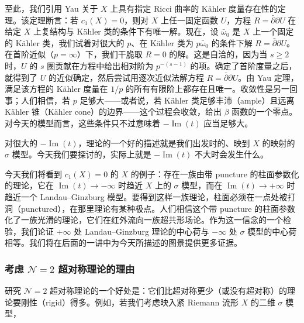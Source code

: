 至此，我们引用 Yau 关于 $X$ 上具有指定 Ricci 曲率的 Kähler 度量存在性的定理。该定理断言：若 $c_1(X)=0$，则对 $X$ 上任一固定函数 $U$，方程 $R=\bar\partial\partial U$ 在给定 $X$ 上复结构与 Kähler 类的条件下有唯一解。现在，设 $\bar\omega_0$ 是 $X$ 上一个固定的 Kähler 类，我们试着对很大的 $p$、在 Kähler 类为 $p\bar\omega_0$ 的条件下解 $R=\bar\partial\partial U$。在首阶近似（$p=\infty$）下，我们干脆取 $R=0$ 的解。这是自洽的，因为当 $s\ge2$ 时，$U$ 的 $s$ 圈贡献在方程中给出相对阶为 $p^{-(s-1)}$ 的项。确定了首阶度量之后，就得到了 $U$ 的近似确定，然后尝试用逐次近似法解方程 $R=\bar\partial\partial U$。由 Yau 定理，满足该方程的 Kähler 度量在 $1/p$ 的所有有限阶上都存在且唯一。收敛性是另一回事；人们相信，若 $p$ 足够大——或者说，若 Kähler 类足够丰沛（ample）且远离 Kähler 锥（Kähler cone）的边界——这个过程会收敛，给出 $\beta$ 函数的一个零点。对今天的模型而言，这些条件只不过意味着 $-\operatorname{Im}(t)$ 应当足够大。

对很大的 $-\operatorname{Im}(t)$，理论的一个好的描述就是我们出发时的、映到 $X$ 的映射的 $\sigma$ 模型。今天我们要探讨的，实际上就是 $-\operatorname{Im}(t)$ 不大时会发生什么。

今天我们将看到 $c_1(X)=0$ 的 $X$ 的例子：存在一族由带 puncture 的柱面参数化的理论，它在 $\operatorname{Im}(t)\to-\infty$ 时趋近 $X$ 上的 $\sigma$ 模型，而在 $\operatorname{Im}(t)\to+\infty$ 时趋近一个 Landau--Ginzburg 模型。要得到这样一族理论，柱面必须在一点处被打洞（punctured），在那里理论有某种极点。人们相信这个带 puncture 的柱面参数化了一族光滑的理论，它们在红外流向一族超共形场论。作为这一信念的一个检验，我们论证 $+\infty$ 处 Landau--Ginzburg 理论的中心荷与 $-\infty$ 处 $\sigma$ 模型的中心荷相等。我们将在后面的一讲中为今天所描述的图景提供更多证据。

\subsubsection{考虑 $\mathcal{N}=2$ 超对称理论的理由}

研究 $\mathcal{N}=2$ 超对称理论的一个好处是：它们比超对称更少（或没有超对称）的理论要刚性（rigid）得多。例如，若我们考虑映入紧 Riemann 流形 $X$ 的二维 $\sigma$ 模型，


